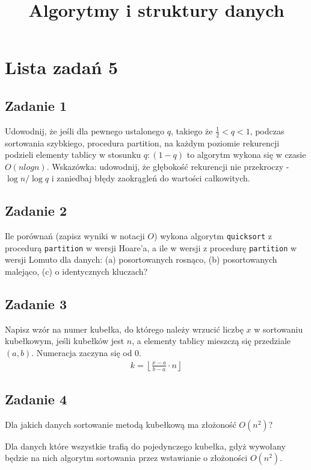 \documentclass{article}
\begin{document}
\title{Algorytmy i struktury danych}
\author{}
\date{}
\maketitle

\section*{Lista zadań 5}

\subsection*{Zadanie 1}
Udowodnij, że jeśli dla pewnego ustalonego $q$, takiego że $\frac{1}{2} < q < 1$,
podczas sortowania szybkiego, procedura partition, na każdym poziomie rekurencji podzieli elementy
tablicy w stosunku $q : (1 - q)$ to algorytm wykona się w czasie $O(n log n)$. Wskazówka: udowodnij, że głębokość
rekurencji nie przekroczy - $\log n / \log q$ i zaniedbaj błędy zaokrągleń do wartości całkowitych.

\subsection*{Zadanie 2}
Ile porównań (zapisz wyniki w notacji $O$) wykona algorytm \verb+quicksort+ z
procedurą \verb+partition+ w wersji Hoare'a, a ile w wersji z procedurę \verb+partition+ w wersji Lomuto dla
danych: (a) posortowanych rosnąco, (b) posortowanych malejąco, (c) o identycznych kluczach?

\subsection*{Zadanie 3}
Napisz wzór na numer kubełka, do którego należy wrzucić liczbę $x$ w sortowaniu kubełkowym, jeśli
kubełków jest $n$, a elementy tablicy mieszczą się przedziale $(a, b)$. Numeracja zaczyna się od $0$.
\begin{gather*}
    k = \left \lfloor \frac{x - a}{b - a} \cdot n \right \rfloor
\end{gather*}

\subsection*{Zadanie 4}
Dla jakich danych sortowanie metodą kubełkową ma złożoność $O(n^2)$?
\begin{center}
    Dla danych które wszystkie trafią do pojedynczego kubełka, gdyż wywołany będzie na nich
    algorytm sortowania przez wstawianie o złożoności $O(n^2)$.
\end{center}
\end{document}
